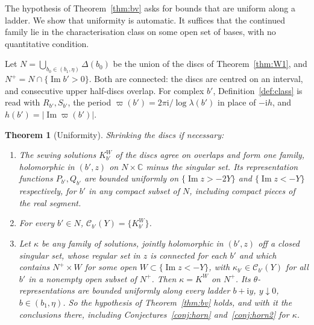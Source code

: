 \documentclass[11pt,a4paper]{article}
\newtheorem{theorem}{Theorem}
\theoremstyle{definition}
\newcommand{\Rr}{R}
\newcommand{\Kk}{K}
\newcommand{\ii}{\mathrm{i}}
\begin{document}
The hypothesis of Theorem~\ref{thm:bv} asks for bounds that are uniform along
a ladder.  We show that uniformity is automatic.  It suffices that the
continued family lie in the characterisation class on some open set of bases,
with no quantitative condition.

Let $N=\bigcup_{b_0\in(b_1,\eta)}\Delta(b_0)$ be the union of the discs of
Theorem~\ref{thm:W1}, and $N^+=N\cap\{\operatorname{Im}b'>0\}$.  Both are
connected: the discs are centred on an interval, and consecutive upper
half-discs overlap.  For complex $b'$, Definition~\ref{def:class} is read with
$\Rr_{b'},S_{b'}$, the period $\varpi(b')=2\pi\ii/\log\lambda(b')$ in place of
$-\ii h$, and $h(b')=|\operatorname{Im}\varpi(b')|$.

\begin{theorem}[Uniformity]\label{thm:unif}
Shrinking the discs if necessary:
\begin{enumerate}
\item The sewing solutions $\Kk^W_{b'}$ of the discs agree on overlaps and form
  one family, holomorphic in $(b',z)$ on $N\times\mathbb C$ minus the singular
  set.  Its representation functions $P_{b'},Q_{b'}$ are bounded uniformly on
  $\{\operatorname{Im}z>-2Y\}$ and $\{\operatorname{Im}z<-Y\}$ respectively,
  for $b'$ in any compact subset of $N$, including compact pieces of the real
  segment.
\item For every $b'\in N$, $\mathcal C_{b'}(Y)=\{\Kk^W_{b'}\}$.
\item Let $\kappa$ be any family of solutions, jointly holomorphic in $(b',z)$
  off a closed singular set, whose regular set in $z$ is connected for each
  $b'$ and which contains $N^+\times W$ for some open
  $W\subset\{\operatorname{Im}z<-Y\}$, with $\kappa_{b'}\in\mathcal C_{b'}(Y)$ for all $b'$ in a nonempty open
  subset of $N^+$.  Then $\kappa=\Kk^W$ on $N^+$.  Its
  $\theta$-representations are bounded uniformly along every ladder
  $b+\ii y$, $y\downarrow0$, $b\in(b_1,\eta)$.  So the hypothesis of
  Theorem~\ref{thm:bv} holds, and with it the conclusions there, including
  Conjectures~\ref{conj:horn} and~\ref{conj:horn2} for $\kappa$.
\end{enumerate}
\end{theorem}
\end{document}
